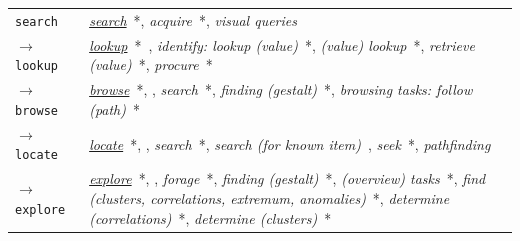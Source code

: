 \begin{table}
\begin{center}
\begin{tabular}{p{}>{\RaggedRight}p{}}
        
    
    \\  \hline \rowcolor{blue!10} 
    
        {\tt search}\index{{\tt search}} &
    
            {\it \underline{search}}~\cite{Card1999,Pirolli2005,Zhou1998}*,
            {\it acquire}~\cite{Mullins1993}*,
            {\it visual queries}~\cite{Ware2012}
    
    \\
    
        {\tt $\rightarrow$ lookup}\index{{\tt lookup}} &
    
        	{\it \underline{lookup}}~\cite{Casner1991}*~\cite{Marchionini2006},
        	{\it identify: lookup (value)}~\cite{Wehrend1990}*,
        	{\it (value) lookup}~\cite{Roth1990}*,
        	{\it retrieve (value)}~\cite{Amar2005,Lee2006,Pike2009,Roth2012,Roth2013}*\cite{Tory2004},
        	{\it procure}~\cite{Roth2012,Roth2013}*
    
    \\ \rowcolor{gray!10}
    
        {\tt $\rightarrow$ browse}\index{{\tt browse}} &
    
            {\it \underline{browse}}~\cite{Card1999,Mullins1993,Pike2009,Spence2007}*, \cite{Dork2012,Toms2000}, %
        	{\it search}~\cite{Roth2012,Roth2013}*, %
        	{\it finding (gestalt)}~\cite{Buja1996}*,
        	{\it browsing tasks: follow (path)}~\cite{Lee2006}*
    
    \\
    
        {\tt $\rightarrow$ locate}\index{{\tt locate}} &
    
            {\it \underline{locate}}~\cite{Liu2010,Mullins1993,Valiati2006,Wehrend1990,Zhou1998}*, \cite{Friel2001},
        	{\it search}~\cite{Casner1991}*\cite{Dork2012},
        	{\it search (for known item)}~\cite{Marchionini2006},
        	{\it seek}~\cite{Spence2007}*,
        	{\it pathfinding}~\cite{Ware2012}
    
    \\ \rowcolor{gray!10}
    
        {\tt $\rightarrow$ explore}\index{{\tt explore}} &
    
        	{\it \underline{explore}}~\cite{Liu2010,Pike2009,Yi2007}*, \cite{Ware2012,Wilkinson2005}, %
        	{\it forage}~\cite{Card1999,Liu2010,Pirolli2005}*,
        	{\it finding (gestalt)}~\cite{Buja1996}*,
        	{\it (overview) tasks}~\cite{Lee2006}*,
        	{\it find (clusters, correlations, extremum, anomalies)}~\cite{Amar2005,Lee2006,Pike2009}*,
        	{\it determine (correlations)}~\cite{Roth1990}*,
        	{\it determine (clusters)}~\cite{Wehrend1990}*
        	

\end{tabular}
\end{center}
\end{table}
